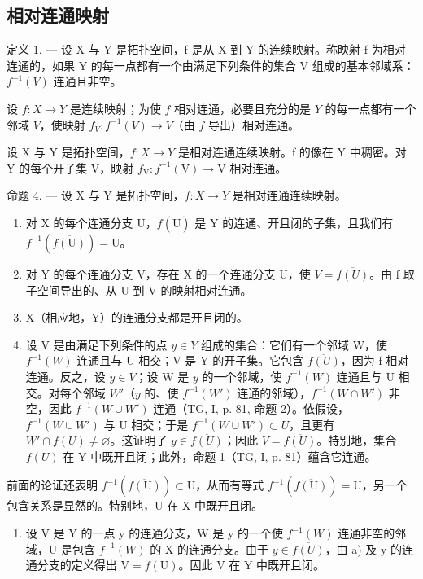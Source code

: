 \subsection{相对连通映射}

定义 1. --- 设 X 与 Y 是拓扑空间，f 是从 X 到 Y 的连续映射。称映射 f 为相对连通的，如果 Y 的每一点都有一个由满足下列条件的集合 V 组成的基本邻域系：\(f^{-1}(V)\) 连通且非空。

设 \(f \colon X \to Y\) 是连续映射；为使 \(f\) 相对连通，必要且充分的是 \(Y\) 的每一点都有一个邻域 \(V\)，使映射 \(f_V \colon f^{-1}(V) \to V\)（由 \(f\) 导出）相对连通。

设 X 与 Y 是拓扑空间，\(f: X \to Y\) 是相对连通连续映射。f 的像在 Y 中稠密。对 Y 的每个开子集 V，映射 \(f_{\mathrm{V}}: f^{-1}(\mathrm{V}) \to \mathrm{V}\) 相对连通。

命题 4. --- 设 X 与 Y 是拓扑空间，\(f: X \to Y\) 是相对连通连续映射。

\begin{enumerate}
\def\labelenumi{\alph{enumi})}
\item
  对 X 的每个连通分支 U，\(f(\overline{\mathrm{U}})\) 是 Y 的连通、开且闭的子集，且我们有 \(f^{-1}(\overline{f(\mathrm{U})}) = \mathrm{U}\)。
\item
  对 Y 的每个连通分支 V，存在 X 的一个连通分支 U，使 \(V = \overline{f(U)}\)。由 f 取子空间导出的、从 U 到 V 的映射相对连通。
\item
  X（相应地，Y）的连通分支都是开且闭的。
\item
设 V 是由满足下列条件的点 \(y \in Y\) 组成的集合：它们有一个邻域 W，使 \(f^{-1}(W)\) 连通且与 U 相交；V 是 Y 的开子集。它包含 \(\overline{f(U)}\)，因为 f 相对连通。反之，设 \(y \in V\)；设 W 是 \(y\) 的一个邻域，使 \(f^{-1}(W)\) 连通且与 U 相交。对每个邻域 \(W'\)（\(y\) 的、使 \(f^{-1}(W')\) 连通的邻域），\(f^{-1}(W \cap W')\) 非空，因此 \(f^{-1}(W \cup W')\) 连通（TG, I, p. 81, 命题 2）。依假设，\(f^{-1}(W \cup W')\) 与 U 相交；于是 \(f^{-1}(W \cup W') \subset U\)，且更有 \(W' \cap f(U) \neq \varnothing\)。这证明了 \(y \in \overline{f(U)}\)；因此 \(V = \overline{f(U)}\)。特别地，集合 \(\overline{f(U)}\) 在 Y 中既开且闭；此外，命题 1（TG, I, p. 81）蕴含它连通。
\end{enumerate}

前面的论证还表明 \(f^{-1}(\overline{f(\mathrm{U})}) \subset \mathrm{U}\)，从而有等式 \(f^{-1}(\overline{f(\mathrm{U})}) = \mathrm{U}\)，另一个包含关系是显然的。特别地，U 在 X 中既开且闭。

\begin{enumerate}
\def\labelenumi{\alph{enumi})}
\setcounter{enumi}{1}
\tightlist
\item
设 V 是 Y 的一点 y 的连通分支，W 是 y 的一个使 \(f^{-1}(W)\) 连通非空的邻域，U 是包含 \(f^{-1}(W)\) 的 X 的连通分支。由于 \(y \in \overline{f(U)}\)，由 a) 及 y 的连通分支的定义得出 \(\mathrm{V} = \overline{f(\mathrm{U})}\)。因此 V 在 Y 中既开且闭。
\end{enumerate}


